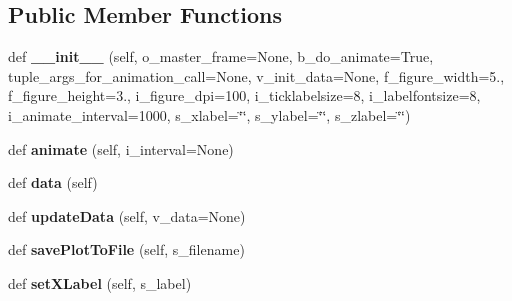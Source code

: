 \subsection*{Public Member Functions}
\begin{DoxyCompactItemize}
\item 
def {\bfseries \+\_\+\+\_\+init\+\_\+\+\_\+} (self, o\+\_\+master\+\_\+frame=None, b\+\_\+do\+\_\+animate=True, tuple\+\_\+args\+\_\+for\+\_\+animation\+\_\+call=None, v\+\_\+init\+\_\+data=None, f\+\_\+figure\+\_\+width=5., f\+\_\+figure\+\_\+height=3., i\+\_\+figure\+\_\+dpi=100, i\+\_\+ticklabelsize=8, i\+\_\+labelfontsize=8, i\+\_\+animate\+\_\+interval=1000, s\+\_\+xlabel=\char`\"{}\char`\"{}, s\+\_\+ylabel=\char`\"{}\char`\"{}, s\+\_\+zlabel=\char`\"{}\char`\"{})\hypertarget{classnegui_1_1pgplottingframe_1_1PGPlottingFrame_ac05707a5b698fc788d4d23ac9dbd7262}{}\label{classnegui_1_1pgplottingframe_1_1PGPlottingFrame_ac05707a5b698fc788d4d23ac9dbd7262}

\item 
def {\bfseries animate} (self, i\+\_\+interval=None)\hypertarget{classnegui_1_1pgplottingframe_1_1PGPlottingFrame_a2af885352e1723c19d626ac63840afea}{}\label{classnegui_1_1pgplottingframe_1_1PGPlottingFrame_a2af885352e1723c19d626ac63840afea}

\item 
def {\bfseries data} (self)\hypertarget{classnegui_1_1pgplottingframe_1_1PGPlottingFrame_a9562e18b5a1a03825eef41141920cb0a}{}\label{classnegui_1_1pgplottingframe_1_1PGPlottingFrame_a9562e18b5a1a03825eef41141920cb0a}

\item 
def {\bfseries update\+Data} (self, v\+\_\+data=None)\hypertarget{classnegui_1_1pgplottingframe_1_1PGPlottingFrame_a679aad29c752aea93bd1c9ef52f1f178}{}\label{classnegui_1_1pgplottingframe_1_1PGPlottingFrame_a679aad29c752aea93bd1c9ef52f1f178}

\item 
def {\bfseries save\+Plot\+To\+File} (self, s\+\_\+filename)\hypertarget{classnegui_1_1pgplottingframe_1_1PGPlottingFrame_ac882de98246f05dad814005cdcd9ba3d}{}\label{classnegui_1_1pgplottingframe_1_1PGPlottingFrame_ac882de98246f05dad814005cdcd9ba3d}

\item 
def {\bfseries set\+X\+Label} (self, s\+\_\+label)\hypertarget{classnegui_1_1pgplottingframe_1_1PGPlottingFrame_a5784cce1469fe2e6ea30cbf79acddb53}{}\label{classnegui_1_1pgplottingframe_1_1PGPlottingFrame_a5784cce1469fe2e6ea30cbf79acddb53}


\end{DoxyCompactItemize}
